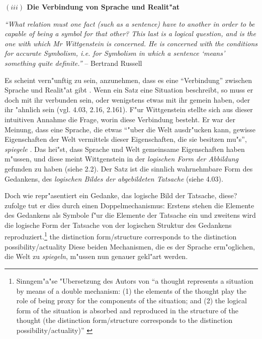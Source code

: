 \documentclass[a4paper, emulatestandardclasses, 12pt]{scrartcl}
\begin{document}
\begin{onehalfspace}
\vspace{5mm}
\noindent\textbf{$(iii)$ Die Verbindung von Sprache und Realit"at}	
\vspace{3mm}
\begin{addmargin}[.065\linewidth]{.065\linewidth}%
\footnotesize

\noindent \emph{"`What relation must one fact (such as a sentence) have to another in order to be capable of being a symbol for that other? This last is a logical question, and is the one with which Mr Wittgenstein is concerned. He is concerned with the conditions for accurate Symbolism, i.e. for Symbolism in which a sentence `means' something quite definite."'} -- Bertrand Russell \cite[S. 7]{wittgenstein1922tractatus}

\end{addmargin}
\normalsize
\vspace{3mm}

Es scheint vern"unftig zu sein, anzunehmen, dass es eine "`Verbindung"' zwischen Sprache und Realit"at gibt \cite[vgl.][S. 1 f.]{emiliani1999formsp}. Wenn ein Satz eine Situation beschreibt, so muss er doch mit ihr verbunden sein, oder wenigstens etwas mit ihr gemein haben, oder ihr "ahnlich sein (vgl. 4.03, 2.16, 2.161). F"ur Wittgenstein stellte sich aus dieser intuitiven Annahme die Frage, worin diese Verbindung besteht. Er war der Meinung, dass eine Sprache, die etwas "`"uber die Welt ausdr"ucken kann, gewisse Eigenschaften der Welt vermittels dieser Eigenschaften, die sie besitzen mu"s"', \emph{spiegele} \cite[siehe][S. 209]{wittgenstein1963tractatus}. Das hei"st, dass Sprache und Welt gemeinsame Eigenschaften haben m"ussen, und diese meint Wittgenstein in der \emph{logischen Form der Abbildung} gefunden zu haben (siehe 2.2). Der Satz ist die sinnlich wahrnehmbare Form des Gedankens, des \emph{logischen Bildes der abgebildeten Tatsache} (siehe 4.03).

Doch wie repr"asentiert ein Gedanke, das logische Bild der Tatsache, diese? \citet{frascolla2007understanding} zufolge tut er dies durch einen Doppelmechanismus: Erstens stehen die Elemente des Gedankens als Symbole f"ur die Elemente der Tatsache ein und zweitens wird die logische Form der Tatsache von der logischen Struktur des Gedankens reproduziert.\footnote{Sinngem"a"se "Ubersetzung des Autors von "`a thought represents a situation by means of a double mechanism: (1) the elements of the thought play the role of being proxy for the components of the situation; and (2) the logical form of the situation is absorbed and reproduced in the structure of the thought (the distinction form/structure corresponds to the distinction possibility/actuality)"' \cite[S.46]{frascolla2007understanding}} the distinction form/structure corresponds to the distinction possibility/actuality Diese beiden Mechanismen, die es der Sprache erm"oglichen, die Welt zu \emph{spiegeln}, m"ussen nun genauer gekl"art werden.


\end{onehalfspace}
\end{document}
